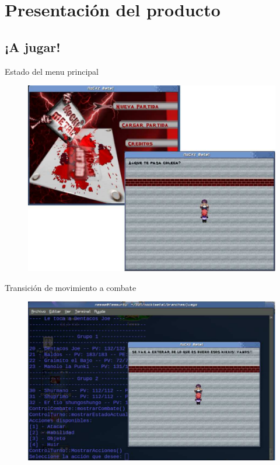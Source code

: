\documentclass[9pt,xcolor=svgnames]{beamer}
\begin{document}
\section{Presentación del producto}

  \subsection{¡A jugar!}

 \begin{frame}{Estado del menu principal}
   \transdissolve

  \begin{figure}[t]
   \centering
   \includegraphics[scale=0.3]{./Imagenes/movimiento.pdf}
  \end{figure}

 \end{frame}


 \begin{frame}{Transición de movimiento a combate}
  \transdissolve

  \begin{figure}[t]
   \centering
   \includegraphics[scale=0.28]{./Imagenes/combate.pdf}
  \end{figure}

 \end{frame}
 
\end{document}
